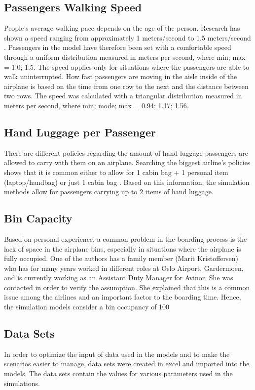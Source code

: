 \subsection{Passengers Walking Speed}
People's average walking pace depends on the age of the person. Research has shown a speed ranging from approximately 1 meters/second to 1.5 meters/second \cite{speed}. Passengers in the model have therefore been set with a comfortable speed through a uniform distribution measured in meters per second, where {min; max} = {1.0; 1.5}. The speed applies only for situations where the passengers are able to walk uninterrupted. How fast passengers are moving in the aisle inside of the airplane is based on the time from one row to the next and the distance between two rows. The speed was calculated with a triangular distribution measured in meters per second, where {min; mode; max} = {0.94; 1.17; 1.56}. 

\subsection{Hand Luggage per Passenger}
There are different policies regarding the amount of hand luggage passengers are allowed to carry with them on an airplane. Searching the biggest airline's policies shows that it is common either to allow for 1 cabin bag + 1 personal item (laptop/handbag) or just 1 cabin bag \cite{luggage}. Based on this information, the simulation methods allow for passengers carrying up to 2 items of hand luggage.   

\subsection{Bin Capacity}
Based on personal experience, a common problem in the boarding process is the lack of space in the airplane bins, especially in situations where the airplane is fully occupied. One of the authors has a family member (Marit Kristoffersen) who has for many years worked in different roles at Oslo Airport, Gardermoen, and is currently working as an Assistant Duty Manager for Avinor. She was contacted in order to verify the assumption. She explained that this is a common issue among the airlines and an important factor to the boarding time. Hence, the simulation models consider a bin occupancy of 100%

\subsection{Data Sets}
In order to optimize the input of data used in the models and to make the scenarios easier to manage, data sets were created in excel and imported into the models. The data sets contain the values for various parameters used in the simulations. 